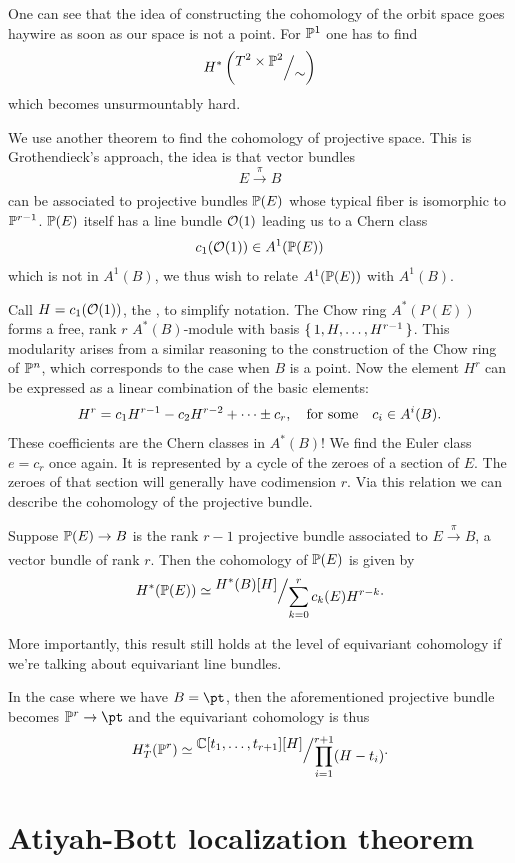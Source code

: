 \documentclass[12pt]{memoir}
\begin{document}
    One can see that the idea of constructing the cohomology of the orbit space goes haywire as soon as our space is not a point. For $\mathbb{P}^1$ one has to find
    $$H^\ast\left(\quot{T^2\x\bP^2}{\sim}\right)$$
    which becomes unsurmountably hard.\par
We use another theorem to find the cohomology of projective space. This is Grothendieck's approach, the idea is that vector bundles 
$$E\xrightarrow[]{\pi}B$$
can be associated to projective bundles $\mathbb{P}(E)$ whose typical fiber is isomorphic to $\mathbb{P}^{r-1}$. $\mathbb{P}(E)$ itself has a line bundle $\mathcal{O}(1)$ leading us to a Chern class
$$c_1(\mathcal{O}(1))\in A^1(\mathbb{P}(E))$$
which is not in $A^1(B)$, we thus wish to relate $A^1(\mathbb{P}(E))$ with $A^1(B)$.\par
Call $H=c_1(\mathcal{O}(1))$, the , to simplify notation. The Chow ring $A^\ast(P(E))$ forms a free, rank $r$ $A^\ast(B)$-module with basis $\{\,1,H,\dots,H^{r-1}\,\}$. This modularity arises from a similar reasoning to the construction of the Chow ring of $\mathbb{P}^n$, which corresponds to the case when $B$ is a point. Now the element $H^r$ can be expressed as a linear combination of the basic elements: 
$$H^r=c_1H^{r-1}-c_2H^{r-2}+\dots\pm c_r,\quad\text{for some}\quad c_i\in A^i(B).$$
These coefficients are the Chern classes in $A^\ast(B)$! We find the Euler class $e=c_r$ once again. It is represented by a cycle of the zeroes of a section of $E$. The zeroes of that section will generally have codimension $r$. Via this relation we can describe the cohomology of the projective bundle.

\begin{Th}
    Suppose $\mathbb{P}(E)\to B$ is the rank $r-1$ projective bundle associated to $E\xrightarrow[]{\pi}B$, a vector bundle of rank $r$. Then the cohomology of $\mathbb{P}(E)$ is given by
    $$H^\ast(\bP(E))\isom\quot{H^\ast(B)[H]}{\sum_{k=0}^{r}c_k(E)H^{r-k}}.$$
\end{Th}
More importantly, this result still holds at the level of equivariant cohomology if we're talking about equivariant line bundles.

\begin{Ex}\label{ex:projective-space-torus-cohomology}
    In the case where we have $B=\pt$, then the aforementioned projective bundle becomes $\bP^{r}\to\pt$ and the equivariant cohomology is thus 
    $$H^\ast_T(\bP^{r})\isom\quot{\bC[t_1,\dots,t_{r+1}][H]}{\prod_{i=1}^{r+1}(H-t_i)}.$$
\end{Ex}

\section{Atiyah-Bott localization theorem}
\end{document}
